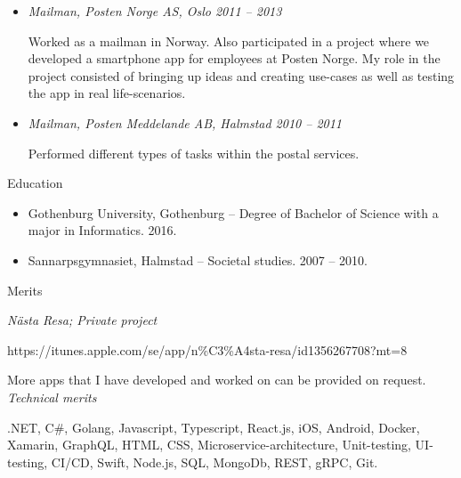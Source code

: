 \begin{itemize}
  \item {\itshape Mailman, Posten Norge AS, Oslo 2011 – 2013}

  Worked as a mailman in Norway. Also participated in a project where we developed
  a smartphone app for employees at Posten Norge. My role in the project consisted
  of bringing up ideas and creating use-cases as well as testing the app in real life-scenarios.

  \item {\itshape Mailman, Posten Meddelande AB, Halmstad 2010 – 2011}

  Performed different types of tasks within the postal services.

\end{itemize}

\vspace{12px}

{\itshape\Large\begin{center}
Education
\end{center}}

\vspace{12px}

\begin{itemize}
  \item Gothenburg University, Gothenburg – Degree of Bachelor of Science with a major in Informatics. 2016.

  \item Sannarpsgymnasiet, Halmstad – Societal studies. 2007 – 2010.
\end{itemize}

\newpage

{\itshape\Large\begin{center}
Merits
\end{center}}

\vspace{12px}

{\itshape Nästa Resa; Private project}

https://itunes.apple.com/se/app/n\%C3\%A4sta-resa/id1356267708?mt=8

More apps that I have developed and worked on can be provided on request.\\

{\itshape Technical merits}

.NET, C\#, Golang, Javascript, Typescript, React.js, iOS, Android, Docker, Xamarin, GraphQL, HTML,
CSS, Microservice-architecture, Unit-testing, UI-testing, CI/CD, Swift, Node.js, SQL, MongoDb, REST, gRPC, Git.\\

